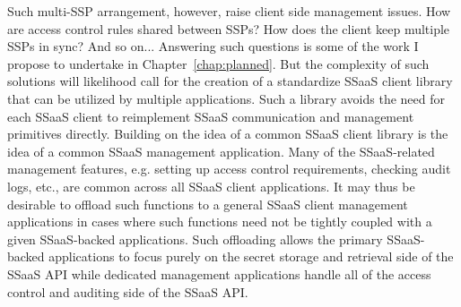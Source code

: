 Such multi-SSP arrangement, however, raise client side management
issues. How are access control rules shared between SSPs? How does the
client keep multiple SSPs in sync? And so on... Answering such
questions is some of the work I propose to undertake in
Chapter~\ref{chap:planned}. But the complexity of such solutions will
likelihood call for the creation of a standardize SSaaS client library
that can be utilized by multiple applications. Such a library avoids
the need for each SSaaS client to reimplement SSaaS communication and
management primitives directly. Building on the idea of a common SSaaS
client library is the idea of a common SSaaS management
application. Many of the SSaaS-related management features,
e.g. setting up access control requirements, checking audit logs,
etc., are common across all SSaaS client applications. It may thus be
desirable to offload such functions to a general SSaaS client
management applications in cases where such functions need not be
tightly coupled with a given SSaaS-backed applications. Such
offloading allows the primary SSaaS-backed applications to focus
purely on the secret storage and retrieval side of the SSaaS API while
dedicated management applications handle all of the access control and
auditing side of the SSaaS API.

